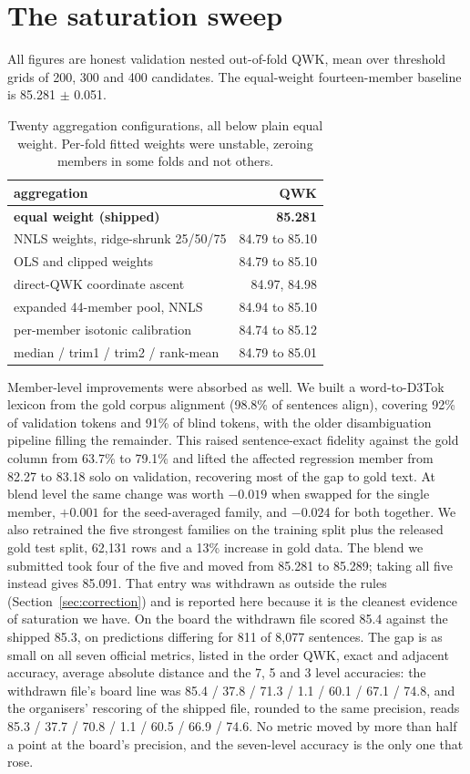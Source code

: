 \section{The saturation sweep}
\label{app:saturation}

All figures are honest validation nested out-of-fold QWK, mean over threshold grids of 200,
300 and 400 candidates. The equal-weight fourteen-member baseline is 85.281 $\pm$ 0.051.

\begin{table}[h]
\centering\small
\begin{tabular}{@{}lr@{}}
\toprule
aggregation & QWK \\
\midrule
\textbf{equal weight (shipped)} & \textbf{85.281} \\
NNLS weights, ridge-shrunk 25/50/75 & 84.79 to 85.10 \\
OLS and clipped weights & 84.79 to 85.10 \\
direct-QWK coordinate ascent & 84.97, 84.98 \\
expanded 44-member pool, NNLS & 84.94 to 85.10 \\
per-member isotonic calibration & 84.74 to 85.12 \\
median / trim1 / trim2 / rank-mean & 84.79 to 85.01 \\
\bottomrule
\end{tabular}
\caption{Twenty aggregation configurations, all below plain equal weight. Per-fold fitted
weights were unstable, zeroing members in some folds and not others.}
\end{table}

Member-level improvements were absorbed as well. We built a word-to-D3Tok lexicon from the
gold corpus alignment (98.8\% of sentences align), covering 92\% of validation tokens and
91\% of blind tokens, with the older disambiguation pipeline filling the remainder. This
raised sentence-exact fidelity against the gold column from 63.7\% to 79.1\% and lifted the
affected regression member from 82.27 to 83.18 solo on validation, recovering most of the
gap to gold text. At blend level the same change was worth $-0.019$ when swapped for the
single member, $+0.001$ for the seed-averaged family, and $-0.024$ for both together.
We also retrained the five strongest families on the training split plus the released gold test
split, 62{,}131 rows and a 13\% increase in gold data. The blend we submitted took four of the
five and moved from 85.281 to 85.289; taking all five instead gives 85.091. That entry was
withdrawn as outside the rules (Section~\ref{sec:correction}) and is reported here because it
is the cleanest evidence of saturation we have. On the board the withdrawn file scored 85.4
against the shipped 85.3, on predictions differing for 811 of 8{,}077 sentences. The gap is
as small on all seven official metrics, listed in the order QWK, exact and adjacent accuracy,
average absolute distance and the 7, 5 and 3 level accuracies: the withdrawn file's board
line was 85.4 / 37.8 / 71.3 / 1.1 / 60.1 / 67.1 / 74.8, and the organisers' rescoring of the
shipped file, rounded to the same precision, reads 85.3 / 37.7 / 70.8 / 1.1 / 60.5 / 66.9 /
74.6. No metric moved by more
than half a point at the board's precision, and the seven-level accuracy is the only one
that rose.

